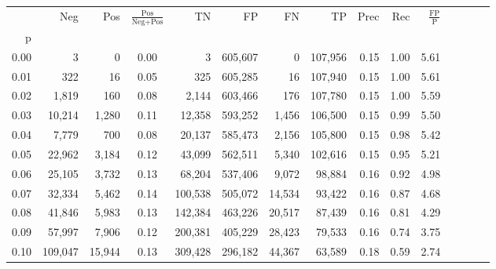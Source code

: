 \begin{tabular}{rrrcrrrrrrrrrrr}
\toprule
{} &      Neg &     Pos & $\frac{\text{Pos}}{\text{Neg}+\text{Pos}}$ &       TN &       FP &       FN &       TP &  Prec &   Rec & $\frac{\text{FP}}{\text{P}}$ \\
p    &          &         &                                            &          &          &          &          &       &       &                              \\
\midrule
0.00 &        3 &       0 &                                       0.00 &        3 &  605,607 &        0 &  107,956 &  0.15 &  1.00 &                         5.61 \\
0.01 &      322 &      16 &                                       0.05 &      325 &  605,285 &       16 &  107,940 &  0.15 &  1.00 &                         5.61 \\
0.02 &    1,819 &     160 &                                       0.08 &    2,144 &  603,466 &      176 &  107,780 &  0.15 &  1.00 &                         5.59 \\
0.03 &   10,214 &   1,280 &                                       0.11 &   12,358 &  593,252 &    1,456 &  106,500 &  0.15 &  0.99 &                         5.50 \\
0.04 &    7,779 &     700 &                                       0.08 &   20,137 &  585,473 &    2,156 &  105,800 &  0.15 &  0.98 &                         5.42 \\
0.05 &   22,962 &   3,184 &                                       0.12 &   43,099 &  562,511 &    5,340 &  102,616 &  0.15 &  0.95 &                         5.21 \\
0.06 &   25,105 &   3,732 &                                       0.13 &   68,204 &  537,406 &    9,072 &   98,884 &  0.16 &  0.92 &                         4.98 \\
0.07 &   32,334 &   5,462 &                                       0.14 &  100,538 &  505,072 &   14,534 &   93,422 &  0.16 &  0.87 &                         4.68 \\
0.08 &   41,846 &   5,983 &                                       0.13 &  142,384 &  463,226 &   20,517 &   87,439 &  0.16 &  0.81 &                         4.29 \\
0.09 &   57,997 &   7,906 &                                       0.12 &  200,381 &  405,229 &   28,423 &   79,533 &  0.16 &  0.74 &                         3.75 \\
0.10 &  109,047 &  15,944 &                                       0.13 &  309,428 &  296,182 &   44,367 &   63,589 &  0.18 &  0.59 &                         2.74 \\

\end{tabular}
